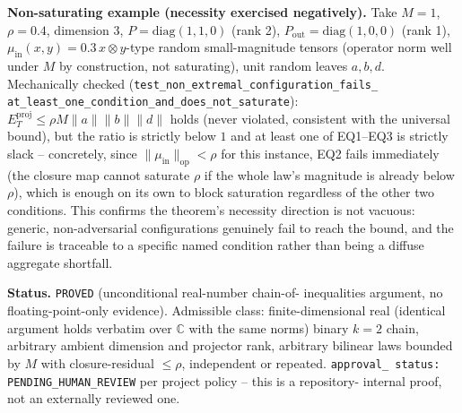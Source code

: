 \textbf{Non-saturating example (necessity exercised negatively).} Take
$M=1$, $\rho=0.4$, dimension 3, $P=\mathrm{diag}(1,1,0)$ (rank 2),
$P_{\mathrm{out}}=\mathrm{diag}(1,0,0)$ (rank 1), $\mu_{\mathrm{in}}(x,y)=
0.3\,x\otimes y$-type random small-magnitude tensors (operator norm well
under $M$ by construction, not saturating), unit random leaves $a,b,d$.
Mechanically checked (\texttt{test\_non\_extremal\_configuration\_fails\_
at\_least\_one\_condition\_and\_does\_not\_saturate}): $E_T^{\mathrm{proj}}
\le\rho M\|a\|\|b\|\|d\|$ holds (never violated, consistent with the
universal bound), but the ratio is strictly below $1$ and at least one of
EQ1--EQ3 is strictly slack -- concretely, since $\|\mu_{\mathrm{in}}\|_{
\mathrm{op}}<\rho$ for this instance, EQ2 fails immediately (the closure
map cannot saturate $\rho$ if the whole law's magnitude is already below
$\rho$), which is enough on its own to block saturation regardless of the
other two conditions. This confirms the theorem's necessity direction is
not vacuous: generic, non-adversarial configurations genuinely fail to
reach the bound, and the failure is traceable to a specific named
condition rather than being a diffuse aggregate shortfall.

\textbf{Status.} \texttt{PROVED} (unconditional real-number chain-of-
inequalities argument, no floating-point-only evidence). Admissible class:
finite-dimensional real (identical argument holds verbatim over
$\mathbb{C}$ with the same norms) binary $k=2$ chain, arbitrary ambient
dimension and projector rank, arbitrary bilinear laws bounded by $M$ with
closure-residual $\le\rho$, independent or repeated. \texttt{approval\_
status: PENDING\_HUMAN\_REVIEW} per project policy -- this is a repository-
internal proof, not an externally reviewed one.
